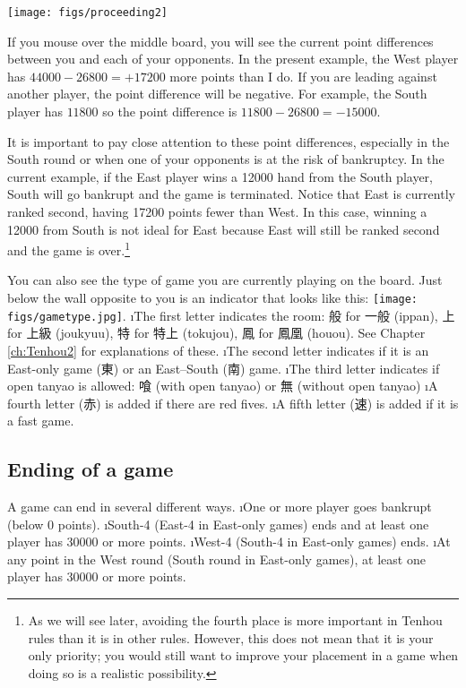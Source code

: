 \begin{center}
\texttt{[image: figs/proceeding2]}
\end{center}

\bigskip
If you mouse over the middle board, you will see the current point differences between you and each of your opponents. 
In the present example, the West player has $44000 - 26800 = + 17200$ more points than I do. If you are leading against another player, the point difference will be negative. For example, the South player has $11800$ so the point difference is $11800 - 26800 = -15000$. 

\bigskip
It is important to pay close attention to these point differences, especially in the South round or when one of your opponents is at the risk of bankruptcy. In the current example, if the East player wins a 12000 hand from the South player, South will go bankrupt and the game is terminated. Notice that East is currently ranked second, having 17200 points fewer than West. In this case, winning a 12000 from South is not ideal for East because East will still be ranked second and the game is over.\footnote{As we will see later, avoiding the fourth place is more important in {\jap Tenhou} rules than it is in other rules. However, this does not mean that it is your only priority; you would still want to improve your placement in a game when doing so is a realistic possibility.}

\bigskip

You can also see the type of game you are currently playing on the board. Just below the wall opposite to you is an indicator that looks like this: \texttt{[image: figs/gametype.jpg]}. 
\bi
\i The first letter indicates the room: 般 for 一般 ({\jap ippan}), 上 for 上級 ({\jap joukyuu}), 特 for 特上 ({\jap tokujou}), 鳳 for 鳳凰 ({\jap houou}). See Chapter \ref{ch:Tenhou2} for explanations of these.
\i The second letter indicates if it is an East-only game (東) or an East--South (南) game.
\i The third letter indicates if open {\jap tanyao} is allowed: 喰 (with open {\jap tanyao}) or 無 (without open {\jap tanyao})
\i A fourth letter (赤) is added if there are red fives.
\i A fifth letter (速) is added if it is a fast game. 
\ei

\vfill

\subsection{Ending of a game}
A game can end in several different ways. 
\bi
\i One or more player goes bankrupt (below 0 points). 
\i South-4 (East-4 in East-only games) ends and at least one player has 30000 or more points.
\i West-4 (South-4 in East-only games) ends.
\i At any point in the West round (South round in East-only games), at least one player has 30000 or more points. 
\ei

